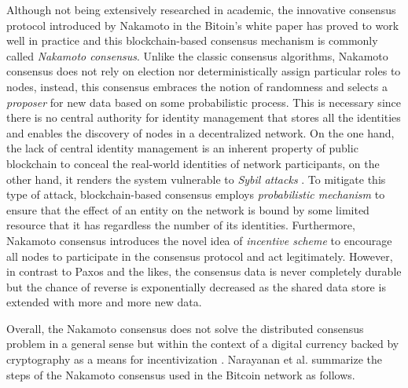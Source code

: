Although not being extensively researched in academic, the innovative consensus protocol introduced by Nakamoto in the Bitoin's white paper \cite{satoshi2008peer} has proved to work well in practice and this blockchain-based consensus mechanism is commonly called \textit{Nakamoto consensus}. Unlike the classic consensus algorithms, Nakamoto consensus does not rely on election nor deterministically assign particular roles to nodes, instead, this consensus embraces the notion of randomness and selects a \textit{proposer} for new data based on some probabilistic process. This is necessary since there is no central authority for identity management that stores all the identities and enables the discovery of nodes in a decentralized network. 
On the one hand, the lack of central identity management is an inherent property of public blockchain to conceal the real-world identities of network participants, on the other hand, it renders the system vulnerable to \textit{Sybil attacks} \cite{douceur2002sybil}. To mitigate this type of attack, blockchain-based consensus employs \textit{probabilistic mechanism} to ensure that the effect of an entity on the network is bound by some limited resource that it has regardless the number of its identities. 
Furthermore, Nakamoto consensus introduces the novel idea of \textit{incentive scheme} to encourage all nodes to participate in the consensus protocol and act legitimately. However, in contrast to Paxos and the likes, the consensus data is never completely durable but the chance of reverse is exponentially decreased as the shared data store is extended with more and more new data.  

Overall, the Nakamoto consensus does not solve the distributed consensus problem in a general sense but within the context of a digital currency backed by cryptography as a means for incentivization \cite{narayanan2016bitcoin}. Narayanan et al. \cite{narayanan2016bitcoin} summarize the steps of the Nakamoto consensus used in the Bitcoin network as follows. 

